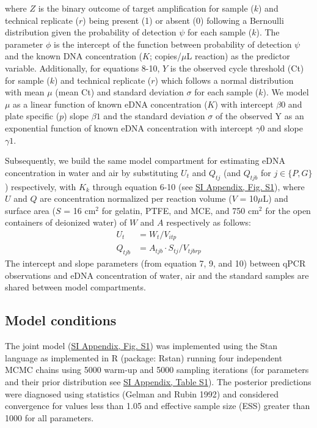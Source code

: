 \documentclass{article}
\begin{document}
where $Z$ is the binary outcome of target amplification for sample ($k$) and technical replicate ($r$) being present (1) or absent (0) following a Bernoulli distribution given the probability of detection $\psi$ for each sample ($k$). The parameter $\phi$ is the intercept of the function between probability of detection $\psi$ and the known DNA concentration ($K$; copies/$\mu$L reaction) as the predictor variable. Additionally, for equations 8-10, $Y$ is the observed cycle threshold (Ct) for sample ($k$) and technical replicate ($r$) which follows a normal distribution with mean $\mu$ (mean Ct) and standard deviation $\sigma$ for each sample ($k$). We model $\mu$ as a linear function of known eDNA concentration ($K$) with intercept $\beta0$ and plate specific ($p$) slope $\beta1$ and the standard deviation $\sigma$ of the observed Y as an exponential function of known eDNA concentration with intercept $\gamma0$ and slope $\gamma1$.

Subsequently, we build the same model compartment for estimating eDNA concentration in water and air by substituting $U_t$ and $Q_{tj}$ (and $Q_{tjb}$ for $j \in \{P,G\}$) respectively, with $K_k$ through equation 6-10 (see \href{SI_Appendix.pdf}{SI Appendix, Fig. S1}), where $U$ and $Q$ are concentration normalized per reaction volume ($V$ = 10$\mu$L) and surface area ($S$ = 16 cm$^2$ for gelatin, PTFE, and MCE, and 750 cm$^2$ for the open containers of deionized water) of $W$ and $A$ respectively as follows:
\begin{align}
    U_t & = W_t / V_{itp}\\
    Q_{tjb} & = A_{tjb} \cdot S_{tj} / V_{tjbrp}
\end{align}
The intercept and slope parameters (from equation 7, 9, and 10) between qPCR observations and eDNA concentration of water, air and the standard samples are shared between model compartments.


\subsection{Model conditions}

The joint model (\href{SI_Appendix.pdf}{SI Appendix, Fig. S1}) was implemented using the Stan language as implemented in R (package: Rstan) running four independent MCMC chains using 5000 warm-up and 5000 sampling iterations (for parameters and their prior distribution see \href{SI_Appendix.pdf}{SI Appendix, Table S1}). The posterior predictions were diagnosed using statistics (Gelman and Rubin 1992) and considered convergence for values less than 1.05 and effective sample size (ESS) greater than 1000 for all parameters.
\end{document}
